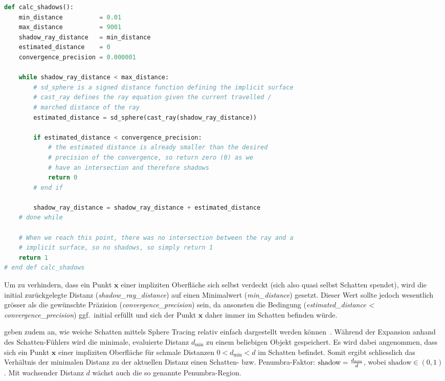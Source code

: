 \begin{minipage}{\linewidth}
\begin{lstlisting}[language=Python,caption={Algorithmus zur Berechnung
        von Schatten.},label={alg:sphere_tracing_shadows},captionpos=b,emph={calc_shadows}]
def calc_shadows():
    min_distance          = 0.01
    max_distance          = 9001
    shadow_ray_distance   = min_distance
    estimated_distance    = 0
    convergence_precision = 0.000001

    while shadow_ray_distance < max_distance:
        # sd_sphere is a signed distance function defining the implicit surface
        # cast_ray defines the ray equation given the current travelled /
        # marched distance of the ray
        estimated_distance = sd_sphere(cast_ray(shadow_ray_distance))

        if estimated_distance < convergence_precision:
            # the estimated distance is already smaller than the desired
            # precision of the convergence, so return zero (0) as we
            # have an intersection and therefore shadows
            return 0
        # end if

        shadow_ray_distance = shadow_ray_distance + estimated_distance
    # done while

    # When we reach this point, there was no intersection between the ray and a
    # implicit surface, so no shadows, so simply return 1
    return 1
# end def calc_shadows
\end{lstlisting}
\end{minipage}

Um zu verhindern, dass ein Punkt $\bm{x}$ einer impliziten Oberfläche
sich selbst verdeckt (sich also quasi selbst Schatten spendet), wird die
initial zurückgelegte Distanz (\textit{shadow\_ray\_distance}) auf einen
Minimalwert (\textit{min\_distance}) gesetzt. Dieser Wert sollte jedoch
wesentlich grösser als die gewünschte Präzision
(\textit{convergence\_precision}) sein, da ansonsten die Bedingung
(\textit{estimated\_distance < convergence\_precision}) ggf.\ initial
erfüllt und sich der Punkt $\bm{x}$ daher immer im Schatten befinden
würde.

\citeauthor{reiner_smi_2011} geben zudem an, wie weiche Schatten mittels
Sphere Tracing relativ einfach dargestellt werden
können~\parencite[S. 7]{reiner_smi_2011}. Während der
Expansion anhand des Schatten-Fühlers wird die minimale, evaluierte
Distanz $d_{\text{min}}$ zu einem beliebigen Objekt gespeichert. Es wird
dabei angenommen, dass sich ein Punkt $\bm{x}$ einer impliziten
Oberfläche für schmale Distanzen $ 0 < d_{\text{min}} < d $ im Schatten
befindet. Somit ergibt schliesslich das Verhältnis der minimalen Distanz
zu der aktuellen Distanz einen Schatten- bzw.  Penumbra-Faktor:
$\text{shadow} = {d_{\text{min}} \over d}$, wobei $\text{shadow} \in (0,
1)$. Mit wachsender Distanz $d$ wächst auch die so genannte
Penumbra-Region.

